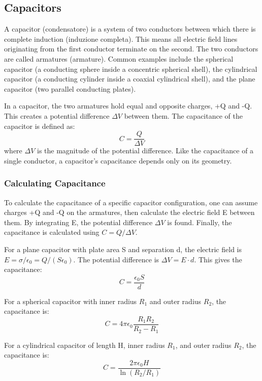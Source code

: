 \subsection{Capacitors}

A capacitor (condensatore) is a system of two conductors between which there is complete induction (induzione completa). This means all electric field lines originating from the first conductor terminate on the second. The two conductors are called armatures (armature). Common examples include the spherical capacitor (a conducting sphere inside a concentric spherical shell), the cylindrical capacitor (a conducting cylinder inside a coaxial cylindrical shell), and the plane capacitor (two parallel conducting plates).

In a capacitor, the two armatures hold equal and opposite charges, +Q and -Q. This creates a potential difference $\Delta V$ between them. The capacitance of the capacitor is defined as:
\begin{equation*}
C = \frac{Q}{\Delta V}
\end{equation*}where $\Delta V$ is the magnitude of the potential difference. Like the capacitance of a single conductor, a capacitor's capacitance depends only on its geometry.

\subsubsection{Calculating Capacitance}
To calculate the capacitance of a specific capacitor configuration, one can assume charges +Q and -Q on the armatures, then calculate the electric field E between them. By integrating E, the potential difference $\Delta V$ is found. Finally, the capacitance is calculated using $C = Q / \Delta V$.

For a plane capacitor with plate area S and separation d, the electric field is $E = \sigma / \epsilon_0 = Q / (S\epsilon_0)$. The potential difference is $\Delta V = E \cdot d$. This gives the capacitance:
\begin{equation*}
C = \frac{\epsilon_0 S}{d}
\end{equation*}

For a spherical capacitor with inner radius $R_1$ and outer radius $R_2$, the capacitance is:
\begin{equation*}
C = 4\pi\epsilon_0 \frac{R_1 R_2}{R_2 - R_1}
\end{equation*}

For a cylindrical capacitor of length H, inner radius $R_1$, and outer radius $R_2$, the capacitance is:
\begin{equation*}
C = \frac{2\pi\epsilon_0 H}{\ln(R_2/R_1)}
\end{equation*}

